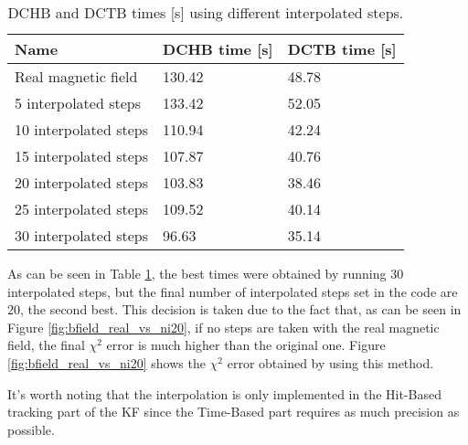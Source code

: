     \begin{table}[ht]
        \centering
        \begin{tabular}{@{}l|ll@{}}
        \toprule
        Name                  & DCHB time [s] & DCTB time [s] \\ \midrule
        Real magnetic field   & 130.42        & 48.78         \\
        5 interpolated steps  & 133.42        & 52.05         \\
        10 interpolated steps & 110.94        & 42.24         \\
        15 interpolated steps & 107.87        & 40.76         \\
        20 interpolated steps & 103.83        & 38.46         \\
        25 interpolated steps & 109.52        & 40.14         \\
        30 interpolated steps &  96.63        & 35.14         \\ \bottomrule
        \end{tabular}
        \caption{\label{tab:interpolated_steps_times} DCHB and DCTB times [s] using different interpolated steps.}
    \end{table}

As can be seen in Table \ref{tab:interpolated_steps_times}, the best times were obtained by running $30$ interpolated steps, but the final number of interpolated steps set in the code are $20$, the second best.
This decision is taken due to the fact that, as can be seen in Figure \ref{fig:bfield_real_vs_ni20}, if no steps are taken with the real magnetic field, the final $\chi^2$ error is much higher than the original one.
Figure \ref{fig:bfield_real_vs_ni20} shows the $\chi^2$ error obtained by using this method.

It's worth noting that the interpolation is only implemented in the Hit-Based tracking part of the KF since the Time-Based part requires as much precision as possible.
